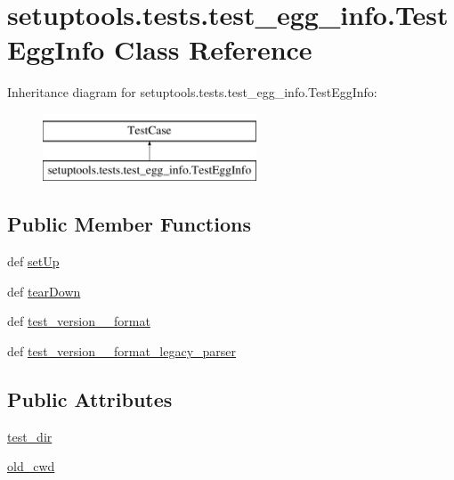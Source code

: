 \hypertarget{classsetuptools_1_1tests_1_1test__egg__info_1_1TestEggInfo}{}\section{setuptools.\+tests.\+test\+\_\+egg\+\_\+info.\+Test\+Egg\+Info Class Reference}
\label{classsetuptools_1_1tests_1_1test__egg__info_1_1TestEggInfo}
Inheritance diagram for setuptools.\+tests.\+test\+\_\+egg\+\_\+info.\+Test\+Egg\+Info\+:\begin{figure}[H]
\begin{center}
\leavevmode
\includegraphics[height=2.000000cm]{classsetuptools_1_1tests_1_1test__egg__info_1_1TestEggInfo}
\end{center}
\end{figure}
\subsection*{Public Member Functions}
\begin{DoxyCompactItemize}
\item 
def \hyperlink{classsetuptools_1_1tests_1_1test__egg__info_1_1TestEggInfo_a472d67f6aa811845a28f1f8329dfc5f8}{set\+Up}
\item 
def \hyperlink{classsetuptools_1_1tests_1_1test__egg__info_1_1TestEggInfo_a883f76da2f680cbcab32f8b57d49e22c}{tear\+Down}
\item 
def \hyperlink{classsetuptools_1_1tests_1_1test__egg__info_1_1TestEggInfo_a56155ce450b48c6b3baa4cea1e117a7b}{test\+\_\+version\+\_\+\_\+format}
\item 
def \hyperlink{classsetuptools_1_1tests_1_1test__egg__info_1_1TestEggInfo_a5ce82128a2e94fc611fb5ff6ab3a045d}{test\+\_\+version\+\_\+\_\+format\+\_\+legacy\+\_\+parser}
\end{DoxyCompactItemize}
\subsection*{Public Attributes}
\begin{DoxyCompactItemize}
\item 
\hyperlink{classsetuptools_1_1tests_1_1test__egg__info_1_1TestEggInfo_a7e5f195da2768407a044a5a971a4a576}{test\+\_\+dir}
\item 
\hyperlink{classsetuptools_1_1tests_1_1test__egg__info_1_1TestEggInfo_aba1f23ba4c1c0b8264ac3d77f1ff7ce9}{old\+\_\+cwd}
\end{DoxyCompactItemize}



